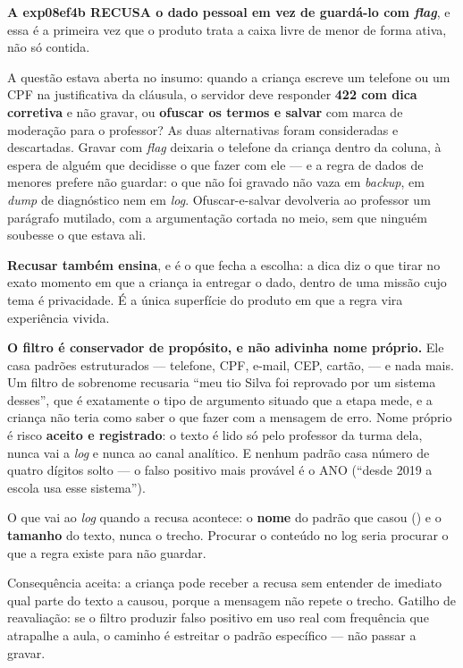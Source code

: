 \begin{decisao}
\textbf{A exp08ef4b RECUSA o dado pessoal em vez de guardá-lo com \emph{flag}}, e
essa é a primeira vez que o produto trata a caixa livre de menor de forma ativa,
não só contida.

A questão estava aberta no insumo: quando a criança escreve um telefone ou um
CPF na justificativa da cláusula, o servidor deve responder \textbf{422 com dica
corretiva} e não gravar, ou \textbf{ofuscar os termos e salvar} com marca de
moderação para o professor? As duas alternativas foram consideradas e
descartadas. Gravar com \emph{flag} deixaria o telefone da criança dentro da
coluna, à espera de alguém que decidisse o que fazer com ele --- e a regra de
dados de menores prefere não guardar: o que não foi gravado não vaza em
\emph{backup}, em \emph{dump} de diagnóstico nem em \emph{log}. Ofuscar-e-salvar
devolveria ao professor um parágrafo mutilado, com a argumentação cortada no
meio, sem que ninguém soubesse o que estava ali.

\textbf{Recusar também ensina}, e é o que fecha a escolha: a dica diz o que
tirar no exato momento em que a criança ia entregar o dado, dentro de uma missão
cujo tema é privacidade. É a única superfície do produto em que a regra vira
experiência vivida.

\textbf{O filtro é conservador de propósito, e não adivinha nome próprio.} Ele
casa padrões estruturados --- telefone, CPF, e-mail, CEP, cartão, 
--- e nada mais. Um filtro de sobrenome recusaria \enquote{meu tio Silva foi
reprovado por um sistema desses}, que é exatamente o tipo de argumento situado
que a etapa mede, e a criança não teria como saber o que fazer com a mensagem de
erro. Nome próprio é risco \textbf{aceito e registrado}: o texto é lido só pelo
professor da turma dela, nunca vai a \emph{log} e nunca ao canal analítico. E
nenhum padrão casa número de quatro dígitos solto --- o falso positivo mais
provável é o ANO (\enquote{desde 2019 a escola usa esse sistema}).

O que vai ao \emph{log} quando a recusa acontece: o \textbf{nome} do padrão que
casou () e o \textbf{tamanho} do texto, nunca o
trecho. Procurar o conteúdo no log seria procurar o que a regra existe para não
guardar.

Consequência aceita: a criança pode receber a recusa sem entender de imediato
qual parte do texto a causou, porque a mensagem não repete o trecho. Gatilho de
reavaliação: se o filtro produzir falso positivo em uso real com frequência que
atrapalhe a aula, o caminho é estreitar o padrão específico --- não passar a
gravar.
\end{decisao}


